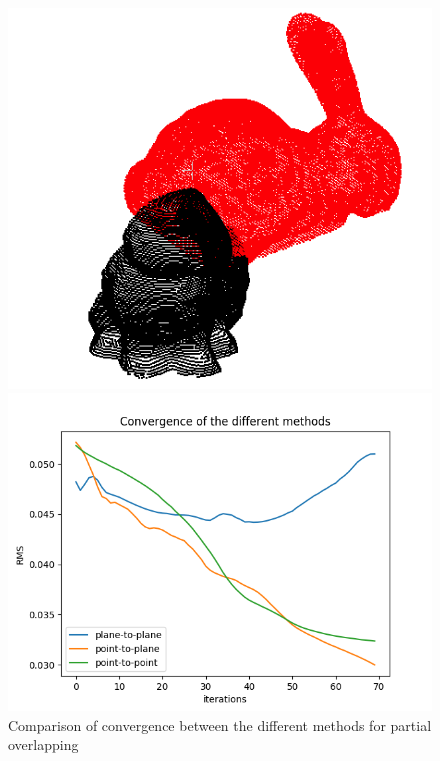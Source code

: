 \documentclass[11pt,letterpaper,leqno]{article}
\begin{document}
\begin{figure}[ht!]
\begin{minipage}{0.5\linewidth}
    \end{minipage}
    \begin{minipage}{0.5\linewidth}
    \includegraphics[width=\linewidth]{img/comparison_6_clouds.png}
    \end{minipage}\hfill
    \begin{minipage}{0.5\linewidth}
    \includegraphics[width=\linewidth]{img/comparison_6.png}
    \end{minipage}
    \caption{Comparison of convergence between the different methods for partial overlapping}
    \label{fig:comp5_6}
\end{figure}
\end{document}
